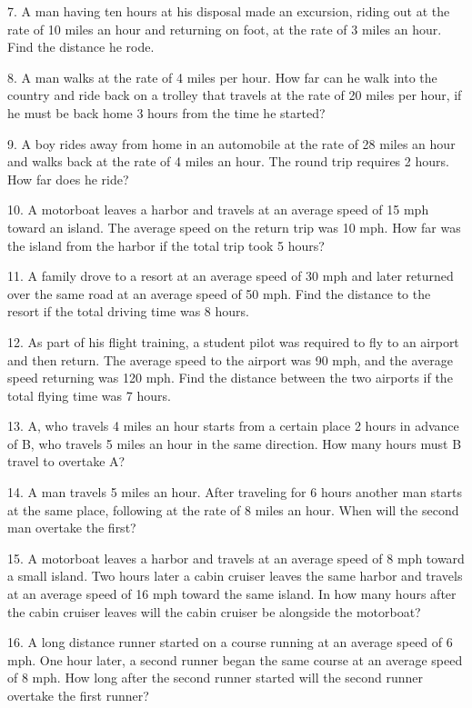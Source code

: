 7. A man having ten hours at his disposal made an excursion, riding out at the
rate of 10 miles an hour and returning on foot, at the rate of
3 miles an hour. Find the distance he rode.

8. A man walks at the rate of 4 miles per hour. How far can he walk into the country and ride back on a trolley that travels at the rate
of 20 miles per hour, if he must be back home 3 hours from the time he
started?

9. A boy rides away from home in an automobile at the rate of 28 miles an hour
and walks back at the rate of 4 miles an hour. The round trip
requires 2 hours. How far does he ride?

10. A motorboat leaves a harbor and travels at an average speed of 15 mph toward an island. The average speed on the return trip
was 10 mph. How far was the island from the harbor if the total
trip took 5 hours?

11. A family drove to a resort at an average speed of 30 mph and later
returned over the same road at an average speed of 50 mph.
Find the distance to the resort if the total driving time was
8 hours.

12. As part of his flight training, a student pilot was required to fly to an
airport and then return. The average speed to the airport was 90
mph, and the average speed returning was 120 mph.
Find the distance between the two airports if the total
flying time was 7 hours.

13. A, who travels 4 miles an hour starts from a certain place 2 hours in
advance of B, who travels 5 miles an hour in the same direction.
How many hours must B travel to overtake A?

14. A man travels 5 miles an hour. After traveling for 6 hours another man
starts at the same place, following at the rate of 8 miles an hour.
When will the second man overtake the first?

15. A motorboat leaves a harbor and travels at an average speed of 8 mph
toward a small island. Two hours later a cabin cruiser leaves the
same harbor and travels at an average speed of 16 mph
toward the same island. In how many hours after the cabin
cruiser leaves will the cabin cruiser be alongside the motorboat?

16. A long distance runner started on a course running at an average speed of
6 mph. One hour later, a second runner began the same course
at an average speed of 8 mph. How long after the second
runner started will the second runner overtake the first
runner?


